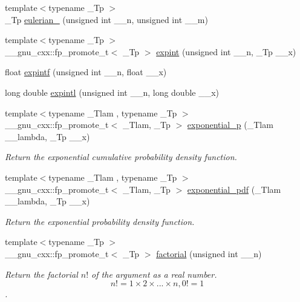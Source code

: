 \begin{DoxyCompactItemize}
\item 
{\footnotesize template$<$typename \+\_\+\+Tp $>$ }\\\+\_\+\+Tp \hyperlink{group__mathsf__gnu_ga9bc456941d5e35cf54ec9c50f2e52884}{eulerian\+\_} (unsigned int \+\_\+\+\_\+n, unsigned int \+\_\+\+\_\+m)
\item 
{\footnotesize template$<$typename \+\_\+\+Tp $>$ }\\\+\_\+\+\_\+gnu\+\_\+cxx\+::fp\+\_\+promote\+\_\+t$<$ \+\_\+\+Tp $>$ \hyperlink{group__mathsf__gnu_gadaf9317953b826975da72d1858f01ea5}{expint} (unsigned int \+\_\+\+\_\+n, \+\_\+\+Tp \+\_\+\+\_\+x)
\item 
float \hyperlink{group__mathsf__gnu_ga85751691a29807d99e990fcba61312f3}{expintf} (unsigned int \+\_\+\+\_\+n, float \+\_\+\+\_\+x)
\item 
long double \hyperlink{group__mathsf__gnu_ga720ca0b275784c8b82193f427a2b3553}{expintl} (unsigned int \+\_\+\+\_\+n, long double \+\_\+\+\_\+x)
\item 
{\footnotesize template$<$typename \+\_\+\+Tlam , typename \+\_\+\+Tp $>$ }\\\+\_\+\+\_\+gnu\+\_\+cxx\+::fp\+\_\+promote\+\_\+t$<$ \+\_\+\+Tlam, \+\_\+\+Tp $>$ \hyperlink{group__mathsf__gnu_gaa546f47f8ab943d2c10b56bec8a44079}{exponential\+\_\+p} (\+\_\+\+Tlam \+\_\+\+\_\+lambda, \+\_\+\+Tp \+\_\+\+\_\+x)
\begin{DoxyCompactList}\small\item\em Return the exponential cumulative probability density function. \end{DoxyCompactList}\item 
{\footnotesize template$<$typename \+\_\+\+Tlam , typename \+\_\+\+Tp $>$ }\\\+\_\+\+\_\+gnu\+\_\+cxx\+::fp\+\_\+promote\+\_\+t$<$ \+\_\+\+Tlam, \+\_\+\+Tp $>$ \hyperlink{group__mathsf__gnu_ga7f35499a94fd8930810809988332161e}{exponential\+\_\+pdf} (\+\_\+\+Tlam \+\_\+\+\_\+lambda, \+\_\+\+Tp \+\_\+\+\_\+x)
\begin{DoxyCompactList}\small\item\em Return the exponential probability density function. \end{DoxyCompactList}\item 
{\footnotesize template$<$typename \+\_\+\+Tp $>$ }\\\+\_\+\+\_\+gnu\+\_\+cxx\+::fp\+\_\+promote\+\_\+t$<$ \+\_\+\+Tp $>$ \hyperlink{group__mathsf__gnu_ga963b1612f50b0964f5f42c9f289aab68}{factorial} (unsigned int \+\_\+\+\_\+n)
\begin{DoxyCompactList}\small\item\em Return the factorial $ n! $ of the argument as a real number. \[ n! = 1 \times 2 \times ... \times n, 0! = 1 \]. \end{DoxyCompactList}\item 

\end{DoxyCompactItemize}
